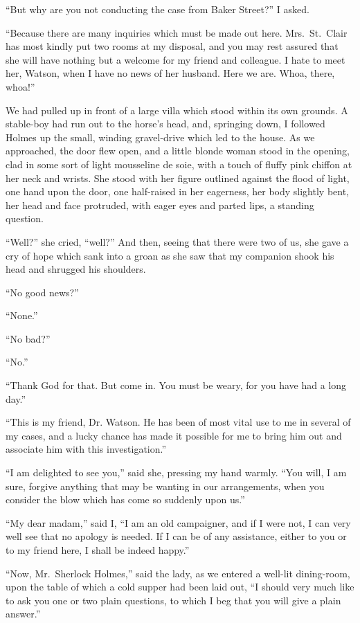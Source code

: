 “But why are you not conducting the case from Baker
Street?” I asked.

“Because there are many inquiries which must be made
out here. Mrs.~St.~Clair has most kindly put two rooms at
my disposal, and you may rest assured that she will have
nothing but a welcome for my friend and colleague. I hate
to meet her, Watson, when I have no news of her husband.
Here we are. Whoa, there, whoa!”

We had pulled up in front of a large villa which stood
within its own grounds. A stable-boy had run out to the horse’s
head, and, springing down, I followed Holmes up the small,
winding gravel-drive which led to the house. As we approached,
the door flew open, and a little blonde woman stood
in the opening, clad in some sort of light mousseline de soie,
with a touch of fluffy pink chiffon at her neck and wrists.
She stood with her figure outlined against the flood of
light, one hand upon the door, one half-raised in her
eagerness, her body slightly bent, her head and face protruded,
with eager eyes and parted lips, a standing
question.

“Well?” she cried, “well?” And then, seeing that there
were two of us, she gave a cry of hope which sank into a
groan as she saw that my companion shook his head and
shrugged his shoulders.

“No good news?”

“None.”

“No bad?”

“No.”

“Thank God for that. But come in. You must be weary,
for you have had a long day.”

“This is my friend, Dr. Watson. He has been of most
vital use to me in several of my cases, and a lucky chance
has made it possible for me to bring him out and associate
him with this investigation.”

“I am delighted to see you,” said she, pressing my hand
warmly. “You will, I am sure, forgive anything that may be
wanting in our arrangements, when you consider the blow
which has come so suddenly upon us.”

“My dear madam,” said I, “I am an old campaigner, and
if I were not, I can very well see that no apology is needed.
If I can be of any assistance, either to you or to my friend
here, I shall be indeed happy.”

“Now, Mr.~Sherlock Holmes,” said the lady, as we entered
a well-lit dining-room, upon the table of which a cold supper
had been laid out, “I should very much like to ask you one
or two plain questions, to which I beg that you will give a
plain answer.”

